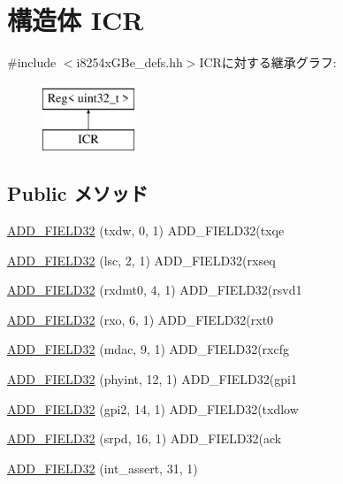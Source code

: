 \hypertarget{structiGbReg_1_1Regs_1_1ICR}{
\section{構造体 ICR}
\label{structiGbReg_1_1Regs_1_1ICR}
}


{\ttfamily \#include $<$i8254xGBe\_\-defs.hh$>$}ICRに対する継承グラフ:\begin{figure}[H]
\begin{center}
\leavevmode
\includegraphics[height=2cm]{structiGbReg_1_1Regs_1_1ICR}
\end{center}
\end{figure}
\subsection*{Public メソッド}
\begin{DoxyCompactItemize}
\item 
\hyperlink{structiGbReg_1_1Regs_1_1ICR_a50757cf9d2e7571fd91bd6bc09a3cf02}{ADD\_\-FIELD32} (txdw, 0, 1) ADD\_\-FIELD32(txqe
\item 
\hyperlink{structiGbReg_1_1Regs_1_1ICR_ae7daeefa510f7cbe64e9d224e889b115}{ADD\_\-FIELD32} (lsc, 2, 1) ADD\_\-FIELD32(rxseq
\item 
\hyperlink{structiGbReg_1_1Regs_1_1ICR_a9da619e60afeee3fefa3405ab3858159}{ADD\_\-FIELD32} (rxdmt0, 4, 1) ADD\_\-FIELD32(rsvd1
\item 
\hyperlink{structiGbReg_1_1Regs_1_1ICR_aa54a114bf8d1bed4e3d069af27cf0774}{ADD\_\-FIELD32} (rxo, 6, 1) ADD\_\-FIELD32(rxt0
\item 
\hyperlink{structiGbReg_1_1Regs_1_1ICR_acce26499f711ab35c8bf33d1c1bf6dca}{ADD\_\-FIELD32} (mdac, 9, 1) ADD\_\-FIELD32(rxcfg
\item 
\hyperlink{structiGbReg_1_1Regs_1_1ICR_aba90cf6dcd0947dc9651305ffabfbf35}{ADD\_\-FIELD32} (phyint, 12, 1) ADD\_\-FIELD32(gpi1
\item 
\hyperlink{structiGbReg_1_1Regs_1_1ICR_a90d8a88102c8ee7114a69dfc237a51f6}{ADD\_\-FIELD32} (gpi2, 14, 1) ADD\_\-FIELD32(txdlow
\item 
\hyperlink{structiGbReg_1_1Regs_1_1ICR_a30b9ba8604c1b6002c612a9922b4cf8f}{ADD\_\-FIELD32} (srpd, 16, 1) ADD\_\-FIELD32(ack
\item 
\hyperlink{structiGbReg_1_1Regs_1_1ICR_a4325117455707ea744b28e9e70608b79}{ADD\_\-FIELD32} (int\_\-assert, 31, 1)
\end{DoxyCompactItemize}


